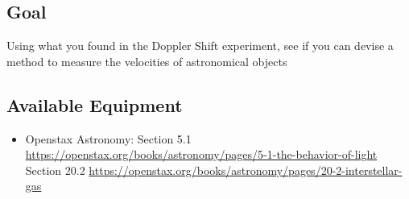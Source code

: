 \subsection{Goal}
Using what you found in the Doppler Shift experiment, see if you can devise a method to measure the velocities of astronomical objects

\subsection{Available Equipment}

\begin{itemize}
	\item Openstax Astronomy: Section 5.1 \url{https://openstax.org/books/astronomy/pages/5-1-the-behavior-of-light}
	Section 20.2 \url{https://openstax.org/books/astronomy/pages/20-2-interstellar-gas}
\end{itemize}

